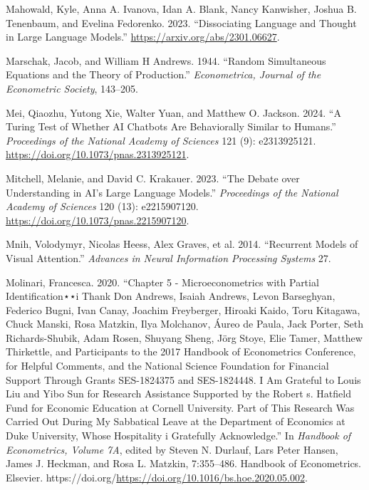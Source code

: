 \documentclass[
]{article}
\newlength{\cslhangindent}
\newenvironment{CSLReferences}[2] %
 {\begin{list}{}{%
  \setlength{\itemindent}{0pt}
  \setlength{\leftmargin}{0pt}
  \setlength{\parsep}{0pt}
  \ifodd #1
   \setlength{\leftmargin}{\cslhangindent}
   \setlength{\itemindent}{-1\cslhangindent}
  \fi
  \setlength{\itemsep}{#2\baselineskip}}}
 {\end{list}}
\begin{document}
\begin{CSLReferences}{1}{0}
Mahowald, Kyle, Anna A. Ivanova, Idan A. Blank, Nancy Kanwisher, Joshua
B. Tenenbaum, and Evelina Fedorenko. 2023. {``Dissociating Language and
Thought in Large Language Models.''}
\url{https://arxiv.org/abs/2301.06627}.

Marschak, Jacob, and William H Andrews. 1944. {``Random Simultaneous
Equations and the Theory of Production.''} \emph{Econometrica, Journal
of the Econometric Society}, 143--205.

Mei, Qiaozhu, Yutong Xie, Walter Yuan, and Matthew O. Jackson. 2024.
{``A Turing Test of Whether AI Chatbots Are Behaviorally Similar to
Humans.''} \emph{Proceedings of the National Academy of Sciences} 121
(9): e2313925121. \url{https://doi.org/10.1073/pnas.2313925121}.

Mitchell, Melanie, and David C. Krakauer. 2023. {``The Debate over
Understanding in AI's Large Language Models.''} \emph{Proceedings of the
National Academy of Sciences} 120 (13): e2215907120.
\url{https://doi.org/10.1073/pnas.2215907120}.

Mnih, Volodymyr, Nicolas Heess, Alex Graves, et al. 2014. {``Recurrent
Models of Visual Attention.''} \emph{Advances in Neural Information
Processing Systems} 27.

Molinari, Francesca. 2020. {``Chapter 5 - Microeconometrics with Partial
Identification⋆⋆i Thank Don Andrews, Isaiah Andrews, Levon Barseghyan,
Federico Bugni, Ivan Canay, Joachim Freyberger, Hiroaki Kaido, Toru
Kitagawa, Chuck Manski, Rosa Matzkin, Ilya Molchanov, Áureo de Paula,
Jack Porter, Seth Richards-Shubik, Adam Rosen, Shuyang Sheng, Jörg
Stoye, Elie Tamer, Matthew Thirkettle, and Participants to the 2017
Handbook of Econometrics Conference, for Helpful Comments, and the
National Science Foundation for Financial Support Through Grants
SES-1824375 and SES-1824448. I Am Grateful to Louis Liu and Yibo Sun for
Research Assistance Supported by the Robert s. Hatfield Fund for
Economic Education at Cornell University. Part of This Research Was
Carried Out During My Sabbatical Leave at the Department of Economics at
Duke University, Whose Hospitality i Gratefully Acknowledge.''} In
\emph{Handbook of Econometrics, Volume 7A}, edited by Steven N. Durlauf,
Lars Peter Hansen, James J. Heckman, and Rosa L. Matzkin, 7:355--486.
Handbook of Econometrics. Elsevier.
https://doi.org/\url{https://doi.org/10.1016/bs.hoe.2020.05.002}.


\end{CSLReferences}
\end{document}
